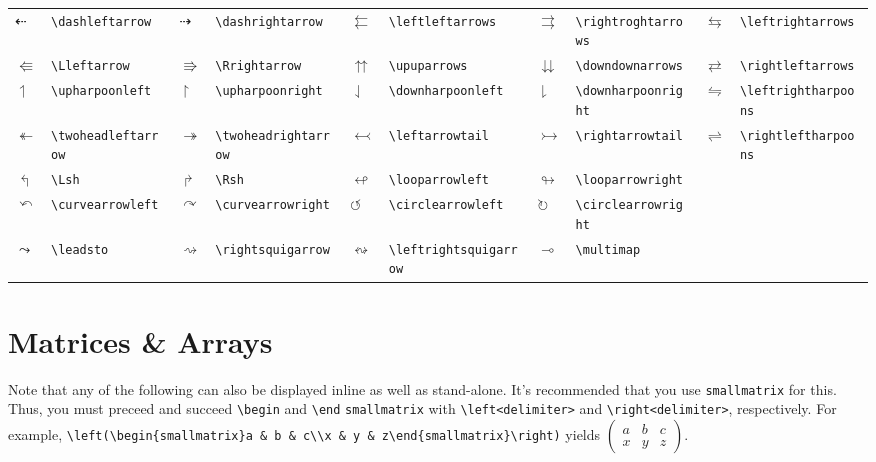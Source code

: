 \documentclass[10pt, english]{article}
\begin{document}
	\begin{center}
		\scriptsize
	\begin{tabular}{ll|ll|ll|ll|ll}
		$\dashleftarrow$ & \verb|\dashleftarrow| & $\dashrightarrow$ & \verb|\dashrightarrow| & $\leftleftarrows$ & \verb|\leftleftarrows| & $\rightrightarrows$ & \verb|\rightroghtarrows| & $\leftrightarrows$ & \verb|\leftrightarrows| \\ 
		$\Lleftarrow$ & \verb|\Lleftarrow| & $\Rrightarrow$ & \verb|\Rrightarrow| & $\upuparrows$ & \verb|\upuparrows| & $\downdownarrows$ & \verb|\downdownarrows| & $\rightleftarrows$ & \verb|\rightleftarrows| \\
		$\upharpoonleft$ & \verb|\upharpoonleft| & $\upharpoonright$ & \verb|\upharpoonright| & $\downharpoonleft$ & \verb|\downharpoonleft| & $\downharpoonright$ & \verb|\downharpoonright| & $\leftrightharpoons$ & \verb|\leftrightharpoons|\\
		$\twoheadleftarrow$ & \verb|\twoheadleftarrow| & $\twoheadrightarrow$ & \verb|\twoheadrightarrow| & $\leftarrowtail$ & \verb|\leftarrowtail| & $\rightarrowtail$ & \verb|\rightarrowtail| & $\rightleftharpoons$ & \verb|\rightleftharpoons| \\
		$\Lsh$ & \verb|\Lsh| & $\Rsh$ & \verb|\Rsh| & $\looparrowleft$ & \verb|\looparrowleft| & $\looparrowright$ & \verb|\looparrowright| \\
		$\curvearrowleft$ & \verb|\curvearrowleft| & $\curvearrowright$ & \verb|\curvearrowright| & $\circlearrowleft$ & \verb|\circlearrowleft| & $\circlearrowright$ & \verb|\circlearrowright| \\
		$\leadsto$ & \verb|\leadsto| & $\rightsquigarrow$ & \verb|\rightsquigarrow| & $\leftrightsquigarrow$ & \verb|\leftrightsquigarrow| & $\multimap$ & \verb|\multimap| \\
	\end{tabular}
	\end{center}

\section{Matrices \& Arrays}

Note that any of the following can also be displayed inline as well as stand-alone. It's recommended that you use \verb|smallmatrix| for this. Thus, you must preceed and succeed \verb|\begin| and \verb|\end| \verb|smallmatrix| with \verb|\left<delimiter>| and \verb|\right<delimiter>|, respectively. For example, \verb|\left(\begin{smallmatrix}a & b & c\\x & y & z\end{smallmatrix}\right)| yields $\left(\begin{smallmatrix}a & b & c\\x & y & z\end{smallmatrix}\right)$. 
\end{document}
